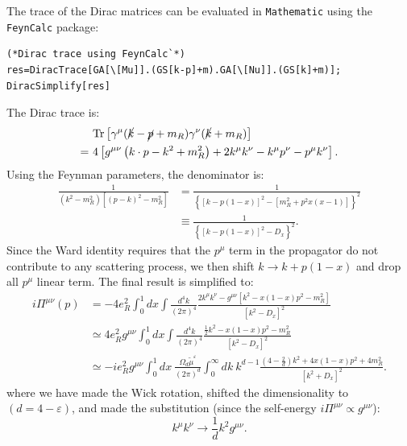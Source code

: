 The trace of the Dirac matrices can be evaluated in \texttt{Mathematic} using the \texttt{FeynCalc} package:

\begin{lstlisting}[style=mathematicaFrameTB]
(*Dirac trace using FeynCalc`*)
res=DiracTrace[GA[\[Mu]].(GS[k-p]+m).GA[\[Nu]].(GS[k]+m)];
DiracSimplify[res]
\end{lstlisting}

The Dirac trace is:
\begin{equation}
\begin{aligned}
	&\ \mathrm{Tr}\left[\gamma^\mu (\cancel k- \cancel p +m_R) \gamma^\nu (\cancel k +m_R) \right] \\
	=&\ 4 \left[g^{\mu\nu} \left(k\cdot p-{k}^2+m_R^2\right)+ 2k^\mu k^\nu - k^\mu p^\nu - p^\mu k^\nu \right].
\end{aligned}
\end{equation}
Using the Feynman parameters, the denominator is:
\begin{equation}
\begin{aligned}
	\frac{1}{(k^2-m_R^2)[(p-k)^2-m_R^2]}
	&= \frac{1}{\left\{[k-p(1-x)]^2-[m_R^2+p^2 x(x-1)]\right\}^2} \\
	&\equiv \frac{1}{\left\{[k-p(1-x)]^2 - D_x \right\}^2}.
\end{aligned}
\end{equation}
Since the Ward identity requires that the $p^\mu$ term in the propagator do not contribute to any scattering process, we then shift $k \rightarrow k + p(1-x)$ and drop all $p^\mu$ linear term. 
The final result is simplified to:
\begin{equation}
\begin{aligned}
	i\Pi^{\mu \nu}(p) 
	&= -4 e_R^{2} \int_0^1 dx
		\int \frac{d^{4} k}{(2 \pi)^{4}}  \frac{2 k^{\mu} k^{\nu}-g^{\mu \nu}\left[k^{2}-x(1-x) p^{2}-m_R^{2}\right]}{\left[k^{2}-D_x \right]^{2}} \\
	&\simeq 4e_R^2 g^{\mu\nu} \int_0^1 dx \int\frac{d^4 k}{(2 \pi)^{4}}  
		\frac{\frac{1}{2}k^{2}-x(1-x) p^{2}-m_R^{2}}{\left[k^{2}-D_x \right]^{2}} \\
	&\simeq -ie_R^2 g^{\mu\nu} \int_0^1 dx\ \frac{\Omega_d \tilde{\mu}^\varepsilon}{(2\pi)^d} \int_0^\infty dk\ k^{d-1} \frac{\left(4-\frac{2}{d} \right) k^{2}+4x(1-x) p^{2}+4m_R^{2}}{\left[k^{2}+D_x\right]^{2}}.
\end{aligned}
\end{equation}
where we have made the Wick rotation, shifted the dimensionality to $(d=4-\varepsilon)$, and made the substitution (since the self-energy $i\Pi^{\mu\nu} \propto g^{\mu\nu}$):
\begin{equation}
	k^\mu k^\nu \rightarrow \frac{1}{d} k^2 g^{\mu\nu}.
\end{equation}

